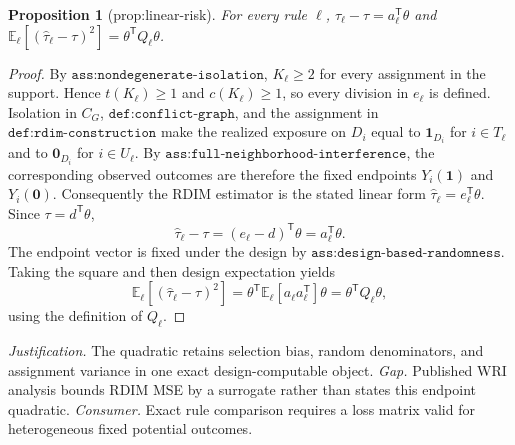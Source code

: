 \documentclass{article}
\newtheorem{proposition}{Proposition}
\begin{document}
\begin{proposition}[prop:linear-risk]\label{prop:linear-risk}
For every rule \(\ell\), \(\widehat\tau_{\ell}-\tau=a_{\ell}^{\mathsf T}\theta\) and \(\mathbb E_{\ell}[(\widehat\tau_{\ell}-\tau)^2]=\theta^{\mathsf T}Q_{\ell}\theta\).
\end{proposition}
\begin{proof}
By \(\texttt{ass:nondegenerate-isolation}\), \(K_\ell\ge2\) for every assignment in the support.  Hence \(t(K_\ell)\ge1\) and \(c(K_\ell)\ge1\), so every division in \(e_\ell\) is defined.  Isolation in \(C_G\), \(\texttt{def:conflict-graph}\), and the assignment in \(\texttt{def:rdim-construction}\) make the realized exposure on \(D_i\) equal to \(\mathbf 1_{D_i}\) for \(i\in T_\ell\) and to \(\mathbf 0_{D_i}\) for \(i\in U_\ell\).  By \(\texttt{ass:full-neighborhood-interference}\), the corresponding observed outcomes are therefore the fixed endpoints \(Y_i(\mathbf 1)\) and \(Y_i(\mathbf 0)\).  Consequently the RDIM estimator is the stated linear form \(\widehat\tau_\ell=e_\ell^{\mathsf T}\theta\).  Since \(\tau=d^{\mathsf T}\theta\),
\[
 \widehat\tau_\ell-\tau=(e_\ell-d)^{\mathsf T}\theta=a_\ell^{\mathsf T}\theta.
\]
The endpoint vector is fixed under the design by \(\texttt{ass:design-based-randomness}\).  Taking the square and then design expectation yields
\[
 \mathbb E_\ell[(\widehat\tau_\ell-\tau)^2]
 =\theta^{\mathsf T}\mathbb E_\ell[a_\ell a_\ell^{\mathsf T}]\theta
 =\theta^{\mathsf T}Q_\ell\theta,
\]
using the definition of \(Q_\ell\).
\end{proof}
\par\smallskip\noindent \textit{Justification.} The quadratic retains selection bias, random denominators, and assignment variance in one exact design-computable object. \textit{Gap.} Published WRI analysis bounds RDIM MSE by a surrogate rather than states this endpoint quadratic. \textit{Consumer.} Exact rule comparison requires a loss matrix valid for heterogeneous fixed potential outcomes.
\end{document}
